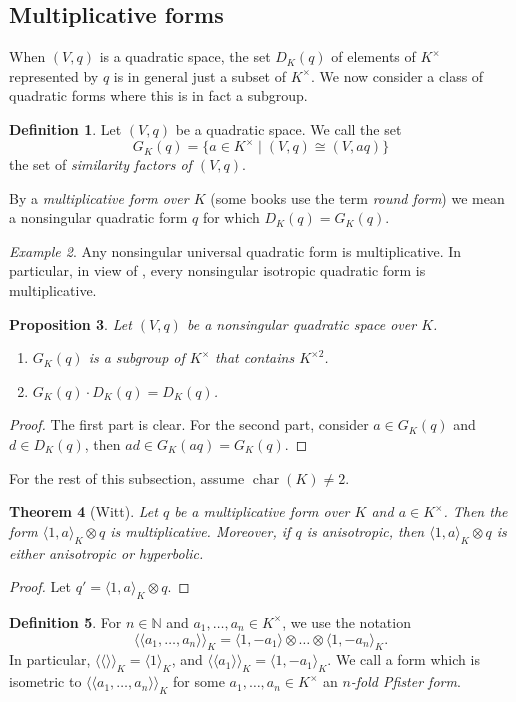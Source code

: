 \documentclass[12pt, leqno, british]{amsart}
\theoremstyle{definition}
\newtheorem{defi}{Definition}[subsection]
\theoremstyle{plain}
\newtheorem{prop}[defi]{Proposition}
\newtheorem{thm}[defi]{Theorem}
\theoremstyle{remark}
\newtheorem{eg}[defi]{Example}
\newcommand{\mbb}{\mathbb}
\newcommand{\nat}{\mbb N}
\DeclareMathOperator{\charac}{char}
\newcommand{\llangle}{\langle\!\langle}
\newcommand{\rrangle}{\rangle\!\rangle}
\begin{document}
\subsection{Multiplicative forms}
When $(V, q)$ is a quadratic space, the set $D_K(q)$ of elements of $K^\times$ represented by $q$ is in general just a subset of $K^\times$.
We now consider a class of quadratic forms where this is in fact a subgroup.
\begin{defi}
Let $(V, q)$ be a quadratic space.
We call the set
$$ G_K(q) = \lbrace a \in K^\times \mid (V, q) \cong (V, aq) \rbrace $$
the set of \emph{similarity factors of $(V, q)$}.

By a \emph{multiplicative form over $K$} (some books use the term \emph{round form}) we mean a nonsingular quadratic form $q$ for which $D_K(q) = G_K(q)$.
\end{defi}
\begin{eg}
Any nonsingular universal quadratic form is multiplicative. In particular, in view of , every nonsingular isotropic quadratic form is multiplicative.
\end{eg}
\begin{prop}
Let $(V, q)$ be a nonsingular quadratic space over $K$.
\begin{enumerate}
\item $G_K(q)$ is a subgroup of $K^\times$ that contains $K^{\times 2}$.
\item $G_K(q) \cdot D_K(q) = D_K(q)$.
\end{enumerate}
\end{prop}
\begin{proof}
The first part is clear.
For the second part, consider $a \in G_K(q)$ and $d \in D_K(q)$, then $ad \in G_K(aq) = G_K(q)$.
\end{proof}
For the rest of this subsection, assume $\charac(K) \neq 2$.
\begin{thm}[Witt]\label{T:Witt-multiplicative-forms}
Let $q$ be a multiplicative form over $K$ and $a \in K^\times$.
Then the form $\langle 1, a \rangle_K \otimes q$ is multiplicative.
Moreover, if $q$ is anisotropic, then $\langle 1, a \rangle_K \otimes q$ is either anisotropic or hyperbolic.
\end{thm}
\begin{proof}
Let $q' = \langle 1, a \rangle_K \otimes q$. %
\end{proof}
\begin{defi}
For $n \in \nat$ and $a_1, \ldots, a_n \in K^\times$, we use the notation
$$ \llangle a_1, \ldots, a_n \rrangle_K = \langle 1, -a_1 \rangle \otimes \ldots \otimes \langle 1, -a_n \rangle_K. $$
In particular, $\llangle \rrangle_K = \langle 1 \rangle_K$, and $\llangle a_1 \rrangle_K = \langle 1, -a_1 \rangle_K$.
We call a form which is isometric to $\llangle a_1, \ldots, a_n \rrangle_K$ for some $a_1, \ldots, a_n \in K^\times$ an \emph{$n$-fold Pfister form}.
\end{defi}
\end{document}

